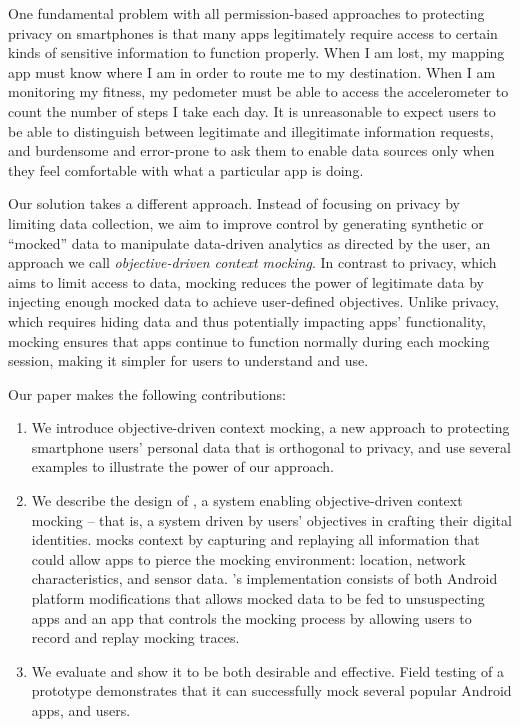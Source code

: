 
One fundamental problem with all permission-based approaches to protecting
privacy on smartphones is that many apps legitimately require access to certain
kinds of sensitive information to function properly. When I am lost, my mapping
app must know where I am in order to route me to my destination. When I am
monitoring my fitness, my pedometer must be able to access the accelerometer to
count the number of steps I take each day. It is unreasonable to expect users
to be able to distinguish between legitimate and illegitimate information
requests, and burdensome and error-prone to ask them to enable data sources
only when they feel comfortable with what a particular app is doing.

Our solution takes a different approach. Instead of focusing on privacy by
limiting data collection, we aim to improve control by generating synthetic or
``mocked'' data to manipulate data-driven analytics as directed by the user, an
approach we call \textit{objective-driven context mocking}. In contrast to
privacy, which aims to limit access to data, mocking reduces the power of
legitimate data by injecting enough mocked data to achieve user-defined
objectives.  Unlike privacy, which requires hiding data and thus potentially
impacting apps' functionality, mocking ensures that apps continue to function
normally during each mocking session, making it simpler for users to understand
and use.

Our paper makes the following contributions:

\begin{enumerate}

\item We introduce objective-driven context mocking, a new approach to
protecting smartphone users' personal data that is orthogonal to privacy, and
use several examples to illustrate the power of our approach.

\item We describe the design of \PocketMocker{}, a system enabling
objective-driven context mocking -- that is, a system driven by users'
objectives in crafting their digital identities.  \PocketMocker{} mocks context
by capturing and replaying all information that could allow apps to pierce the
mocking environment: location, network characteristics, and sensor data.
\PocketMocker{}'s implementation consists of both Android platform
modifications that allows mocked data to be fed to unsuspecting apps and an app
that controls the mocking process by allowing users to record and replay
mocking traces.

\item We evaluate \PocketMocker{} and show it to be both desirable and
effective. Field testing of a \PocketMocker{} prototype demonstrates that it
can successfully mock several popular Android apps, and users.

\end{enumerate}

